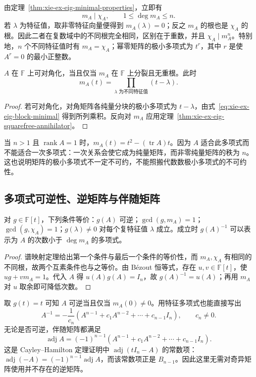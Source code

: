 由定理~\ref{thm:xie-ex-eig-minimal-properties}，立即有
\begin{equation}
m_A\mid\chi_A,\qquad 1\le\deg m_A\le n.
\label{eq:xie-ex-eig-minimal-divides-characteristic}
\end{equation}
若 $\lambda$ 为特征值，取非零特征向量便得到 $m_A(\lambda)=0$；反之 $m_A$ 的根也是 $\chi_A$ 的根。因此二者在复数域中的不同根完全相同，区别在于重数，并且 $\chi_A\mid m_A^n$。特别地，$n$ 个不同特征值时有 $m_A=\chi_A$；幂零矩阵的极小多项式为 $t^r$，其中 $r$ 是使 $A^r=0$ 的最小正整数。

\begin{proposition}
\label{prop:xie-ex-eig-minimal-diagonalization}
$A$ 在 $\mathbb F$ 上可对角化，当且仅当 $m_A$ 在 $\mathbb F$ 上分裂且无重根。此时
\[
m_A(t)=\prod_{\lambda\text{ 为不同特征值}}(t-\lambda).
\]
\end{proposition}
\begin{proof}
若可对角化，对角矩阵各纯量分块的极小多项式为 $t-\lambda$，由式~\eqref{eq:xie-ex-eig-block-minimal} 得到所列乘积。反向对 $m_A$ 应用定理~\ref{thm:xie-ex-eig-squarefree-annihilator}。
\end{proof}

当 $n>1$ 且 $\operatorname{rank}A=1$ 时，$m_A(t)=t^2-(\operatorname{tr}A)t$。因为 $A$ 适合此多项式而不能适合一次多项式：一次关系会使它成为纯量矩阵，而非零纯量矩阵的秩为 $n$。这也说明矩阵的极小多项式不一定不可约，不能照搬代数数极小多项式的不可约性。

\subsection{多项式可逆性、逆矩阵与伴随矩阵}

\begin{proposition}
\label{prop:xie-ex-eig-polynomial-inverse}
对 $g\in\mathbb F[t]$，下列条件等价：$g(A)$ 可逆；$\gcd(g,m_A)=1$；$\gcd(g,\chi_A)=1$；$g(\lambda)\ne0$ 对每个复特征值 $\lambda$ 成立。成立时 $g(A)^{-1}$ 可以表示为 $A$ 的次数小于 $\deg m_A$ 的多项式。
\end{proposition}
\begin{proof}
谱映射定理给出第一个条件与最后一个条件的等价性，而 $m_A,\chi_A$ 有相同的不同根，故两个互素条件也与之等价。由 Bézout 恒等式，存在 $u,v\in\mathbb F[t]$，使 $ug+vm_A=1$。代入 $A$ 得 $u(A)g(A)=I_n$，故 $g(A)^{-1}=u(A)$；再用 $m_A$ 对 $u$ 取余即可降低次数。
\end{proof}

取 $g(t)=t$ 可知 $A$ 可逆当且仅当 $m_A(0)\ne0$。用特征多项式也能直接写出
\begin{equation}
A^{-1}=-\frac1{c_n}\left(A^{n-1}+c_1A^{n-2}+\cdots+c_{n-1}I_n\right),
\qquad c_n\ne0.
\label{eq:xie-ex-eig-inverse-polynomial}
\end{equation}
无论是否可逆，伴随矩阵都满足
\begin{equation}
\operatorname{adj}A=(-1)^{n-1}
\left(A^{n-1}+c_1A^{n-2}+\cdots+c_{n-1}I_n\right).
\label{eq:xie-ex-eig-adjugate-polynomial}
\end{equation}
这是 Cayley--Hamilton 定理证明中 $\operatorname{adj}(tI_n-A)$ 的常数项：$\operatorname{adj}(-A)=(-1)^{n-1}\operatorname{adj}A$，而该常数项正是 $B_{n-1}$。因此这里无需对奇异矩阵使用并不存在的逆矩阵。

